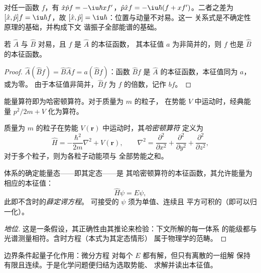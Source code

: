 \begin{example}[正则对易子]\label{ex:b3:quantum-model-systems:canonical}
对任一函数 $f$，有 $\hat x\hat pf = -\iu\hbar xf'$，$\hat p\hat xf =
-\iu\hbar(f + xf')$。二者之差为 $[\hat x,\hat p]f = \iu\hbar f$，故
$[\hat x,\hat p] = \iu\hbar$：位置与动量不对易。这一
关系式是不确定性原理的基础，并构成下文
谐振子全部能谱的基础。
\end{example}

\begin{proposition}[对易算符]\label{prop:b3:quantum-model-systems:commuting}
若 $\hat A$ 与 $\hat B$ 对易，且 $f$ 是 $\hat A$ 的本征函数，
其本征值 $a$ 为非简并的，则 $f$ 也是
$\hat B$ 的本征函数。
\end{proposition}

\begin{proof}
$\hat A(\hat Bf) = \hat B\hat Af = a(\hat Bf)$：函数 $\hat Bf$ 是
$\hat A$ 的本征函数，本征值同为 $a$，或为零。
由于本征值非简并，$\hat Bf$ 为 $f$ 的倍数，记作 $bf$。
\end{proof}

能量算符即为哈密顿算符。对于质量为 $m$ 的粒子，
在势能 $V$ 中运动时，经典能量 $p^2/2m + V$ 化为算符。

\begin{definition}[哈密顿算符]\label{def:b3:quantum-model-systems:schrodinger}
质量为 $m$ 的粒子在势能 $V(\mathbf r)$ 中运动时，其\emph{哈密顿算符}
定义为
\[
\hat H = -\frac{\hbar^2}{2m}\nabla^2 + V(\mathbf r), \qquad \nabla^2 =
\frac{\partial^2}{\partial x^2} + \frac{\partial^2}{\partial y^2} +
\frac{\partial^2}{\partial z^2},
\]
对于多个粒子，则为各粒子动能项与
全部势能之和。
\end{definition}

\begin{theorem}[薛定谔方程]\label{thm:b3:quantum-model-systems:schrodinger}
体系的确定能量态——即其定态——是
其哈密顿算符的本征函数，其允许能量为
相应的本征值：
\[
\hat H\psi = E\psi,
\]
此即不含时的\emph{薛定谔方程}。
可接受的 $\psi$ 须为单值、连续且
平方可积的（即可以归一化）。
\end{theorem}
\begin{proof}[地位]
这是一条假设，其正确性由其推论来检验：下文所解的每一体系
的能级都与光谱测量相符。含时方程（本式为其定态情形）
属于物理学的范畴。
\end{proof}

边界条件起量子化作用：微分方程
对每个 $E$ 都有解，但只有离散的一组解
保持有限且连续。于是化学问题便归结为选取势能、
求解并读出本征值。

